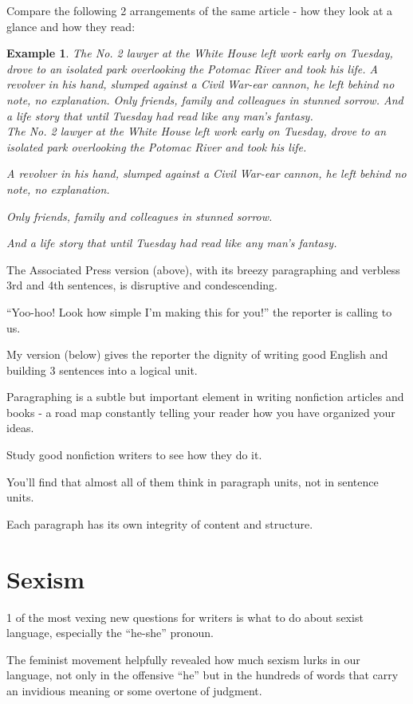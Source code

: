 \documentclass{book}
\numberwithin{equation}{section}
\newtheorem{example}{Example}[chapter]
\begin{document}
Compare the following 2 arrangements of the same article - how they look at a glance and how they read:
\begin{example}
    The No. 2 lawyer at the White House left work early on Tuesday, drove to an isolated park overlooking the Potomac River and took his life. A revolver in his hand, slumped against a Civil War-ear cannon, he left behind no note, no explanation. Only friends, family and colleagues in stunned sorrow. And a life story that until Tuesday had read like any man's fantasy.
    \\
    
    The No. 2 lawyer at the White House left work early on Tuesday, drove to an isolated park overlooking the Potomac River and took his life.
    
    A revolver in his hand, slumped against a Civil War-ear cannon, he left behind no note, no explanation.
    
    Only friends, family and colleagues in stunned sorrow.
    
    And a life story that until Tuesday had read like any man's fantasy.
\end{example}
The Associated Press version (above), with its breezy paragraphing and verbless 3rd and 4th sentences, is disruptive and condescending.

``Yoo-hoo! Look how simple I'm making this for you!'' the reporter is calling to us.

My version (below) gives the reporter the dignity of writing good English and building 3 sentences into a logical unit.

%
Paragraphing is a subtle but important element in writing nonfiction articles and books - a road map constantly telling your reader how you have organized your ideas.

Study good nonfiction writers to see how they do it.

You'll find that almost all of them think in paragraph units, not in sentence units.

Each paragraph has its own integrity of content and structure.

\section{Sexism}
1 of the most vexing new questions for writers is what to do about sexist language, especially the ``he-she'' pronoun.

The feminist movement helpfully revealed how much sexism lurks in our language, not only in the offensive ``he'' but in the hundreds of words that carry an invidious meaning or some overtone of judgment.
\end{document}
